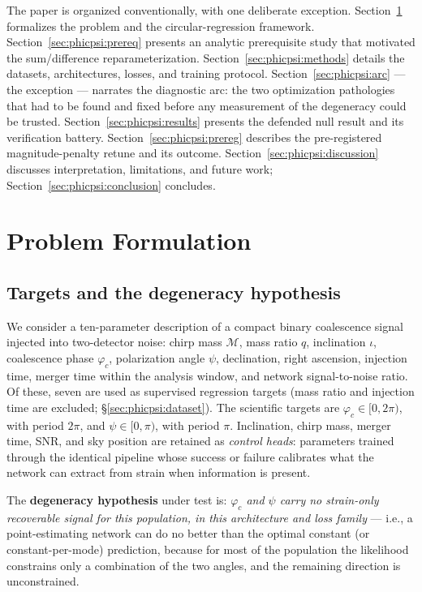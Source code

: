 \documentclass[11pt]{article}
\begin{document}
The paper is organized conventionally, with one deliberate exception.
Section~\ref{sec:phicpsi:problem} formalizes the problem and the circular-regression framework.
Section~\ref{sec:phicpsi:prereq} presents an analytic prerequisite study that motivated the sum/difference reparameterization.
Section~\ref{sec:phicpsi:methods} details the datasets, architectures, losses, and training protocol.
Section~\ref{sec:phicpsi:arc} --- the exception --- narrates the diagnostic arc: the two optimization pathologies that had to be found and fixed before any measurement of the degeneracy could be trusted.
Section~\ref{sec:phicpsi:results} presents the defended null result and its verification battery.
Section~\ref{sec:phicpsi:prereg} describes the pre-registered magnitude-penalty retune and its outcome.
Section~\ref{sec:phicpsi:discussion} discusses interpretation, limitations, and future work; Section~\ref{sec:phicpsi:conclusion} concludes.


\section{Problem Formulation}
\label{sec:phicpsi:problem}

\subsection{Targets and the degeneracy hypothesis}
\label{subsec:targets-and-the-degeneracy-hypothesis}

We consider a ten-parameter description of a compact binary coalescence signal injected into two-detector noise: chirp mass $\mathcal{M}$, mass ratio $q$, inclination $\iota$, coalescence phase $\varphi_c$, polarization angle $\psi$, declination, right ascension, injection time, merger time within the analysis window, and network signal-to-noise ratio.
Of these, seven are used as supervised regression targets (mass ratio and injection time are excluded; \S\ref{sec:phicpsi:dataset}).
The scientific targets are $\varphi_c \in [0, 2\pi)$, with period $2\pi$, and $\psi \in [0, \pi)$, with period $\pi$.
Inclination, chirp mass, merger time, SNR, and sky position are retained as \emph{control heads}: parameters trained through the identical pipeline whose success or failure calibrates what the network can extract from strain when information is present.

The \textbf{degeneracy hypothesis} under test is: \emph{$\varphi_c$ and $\psi$ carry no strain-only recoverable signal for this population, in this architecture and loss family} --- i.e., a point-estimating network can do no better than the optimal constant (or constant-per-mode) prediction, because for most of the population the likelihood constrains only a combination of the two angles, and the remaining direction is unconstrained.
\end{document}
